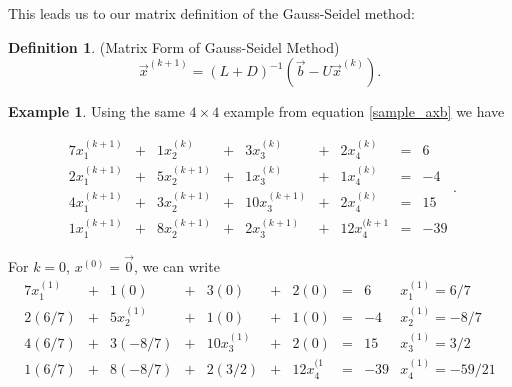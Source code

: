 \documentclass[12pt,letterpaper]{article}
\theoremstyle{definition}
\newtheorem{defn}[thm]{Definition}
\newtheorem{example}[thm]{Example}
\begin{document}
\noindent This leads us to our matrix definition of the Gauss-Seidel method:
\begin{defn}(Matrix Form of Gauss-Seidel Method)
$$\vec{x}^{(k+1)} = (L+D)^{-1}\left(\vec{b}-U\vec{x}^{(k)}\right).$$
\end{defn}
\begin{example}

Using the same $4\times4$ example from equation \ref{sample_axb} we have

\begin{equation*}
    \begin{matrix}
    7x_1^{(k+1)} &+& 1x_2^{(k)} &+& 3x_3^{(k)} &+& 2x_4^{(k)} &=& 6\\
    2x_1^{(k+1)} &+& 5x_2^{(k+1)} &+& 1x_3^{(k)} &+& 1x_4^{(k)} &=& -4\\
    4x_1^{(k+1)} &+& 3x_2^{(k+1)} &+& 10x_3^{(k+1)} &+& 2x_4^{(k)} &=& 15\\
    1x_1^{(k+1)} &+& 8x_2^{(k+1)} &+& 2x_3^{(k+1)} &+& 12x_4^{(k+1} &=& -39
    \end{matrix}.
\end{equation*}

For $k=0$, $x^{(0)}=\vec{0}$, we can write
\begin{equation*}
    \begin{array}{ccccccccc|l}
    7x_1^{(1)} &+& 1(0) &+& 3(0) &+& 2(0) &=& 6 & x_1^{(1)}=6/7 \\
    2(6/7) &+& 5x_2^{(1)} &+& 1(0) &+& 1(0) &=& -4 & x_2^{(1)}=-8/7\\
    4(6/7) &+& 3(-8/7) &+& 10x_3^{(1)} &+& 2(0) &=& 15& x_3^{(1)}=3/2 \\
    1(6/7) &+& 8(-8/7) &+& 2(3/2) &+& 12x_4^{(1} &=& -39& x_4^{(1)}=-59/21
    \end{array}
\end{equation*}


\end{example}
\end{document}
